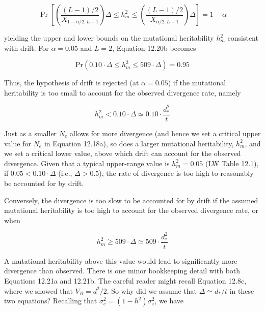\documentclass{article}
\begin{document}
\begin{equation}
\Pr\left[\left(\frac{(L-1)/2}{X_{1-\alpha/2,L-1}}\right)\Delta\leq h_{m}^{2}\leq\left(\frac{(L-1)/2}{X_{\alpha/2,L-1}}\right)\Delta\right]=1-\alpha
\tag{12.20d}
\label{eq:12_20d}
\end{equation}

yielding the upper and lower bounds on the mutational heritability  $ h_{m}^{2} $ consistent with drift. For  $ \alpha = 0.05 $ and  $ L = 2 $, Equation 12.20b becomes

\begin{equation}
\mathrm{P r}\left(0.10\cdot\Delta\leq h_{m}^{2}\leq509\cdot\Delta\right)=0.95
\tag{12.20e}
\label{eq:12_20e}
\end{equation}

Thus, the hypothesis of drift is rejected (at  $ \alpha = 0.05 $) if the mutational heritability is too small to account for the observed divergence rate, namely

\begin{equation}
h_{m}^{2}<0.10\cdot\Delta\simeq0.10\cdot\frac{d_{*}^{2}}{t}
\tag{12.21a}
\label{eq:12_21a}
\end{equation}

Just as a smaller $N_e$ allows for more divergence (and hence we set a critical upper value for $N_e$ in Equation 12.18a), so does a larger mutational heritability, $h_m^2$, and we set a critical lower value, above which drift can account for the observed divergence. Given that a typical upper-range value is $h_m^2 = 0.05$ (LW Table 12.1), if $0.05 < 0.10 \cdot \Delta$ (i.e., $\Delta > 0.5$), the rate of divergence is too high to reasonably be accounted for by drift.

Conversely, the divergence is too slow to be accounted for by drift if the assumed mutational heritability is too high to account for the observed divergence rate, or when

\begin{equation}
h_{m}^{2}\geq509\cdot\Delta\simeq509\cdot\frac{d_{*}^{2}}{t}
\tag{12.21b}
\label{eq:12_21b}
\end{equation}

A mutational heritability above this value would lead to significantly more divergence than observed. There is one minor bookkeeping detail with both Equations 12.21a and 12.21b. The careful reader might recall Equation 12.8c, where we showed that  $ V_B = d^2/2 $. So why did we assume that  $ \Delta \simeq d_*/t $ in these two equations? Recalling that  $ \sigma_e^2 = (1 - h^2)\sigma_z^2 $, we have
\end{document}
